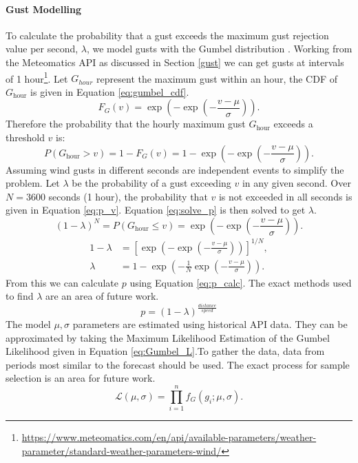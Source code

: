 \paragraph{Gust Modelling}
To calculate the probability that a gust exceeds the maximum gust rejection value per second, $\lambda$, we model gusts with the Gumbel distribution \cite{Gumbel1958}. Working from the Meteomatics \gls{API} as discussed in Section \ref{gust} we can get gusts at intervals of 1 hour\footnote{\url{https://www.meteomatics.com/en/api/available-parameters/weather-parameter/standard-weather-parameters-wind/}}. Let $G_{hour}$ represent the maximum gust within an hour, the \gls{CDF} of \( G_{\text{hour}} \) is given in Equation \ref{eq:gumbel_cdf}.
\begin{equation}\label{eq:gumbel_cdf}
    F_G(v) = \exp\left(-\exp\left(-\frac{v - \mu}{\sigma}\right)\right).
\end{equation}
Therefore the probability that the hourly maximum gust \( G_{\text{hour}} \) exceeds a threshold \( v \) is:
\begin{equation}
    P(G_{\text{hour}} > v) = 1 - F_G(v) = 1 - \exp\left(-\exp\left(-\frac{v - \mu}{\sigma}\right)\right).
\end{equation}
Assuming wind gusts in different seconds are independent events to simplify the problem. Let \( \lambda \) be the probability of a gust exceeding \( v \) in any given second. Over \( N = 3600 \) seconds (1 hour), the probability that \( v \) is not exceeded in all seconds is given in Equation \ref{eq:p_v}. Equation \ref{eq:solve_p} is then solved to get $\lambda$.
\begin{equation}\label{eq:p_v}
    (1 - \lambda)^{N} = P(G_{\text{hour}} \leq v) = \exp\left(-\exp\left(-\frac{v - \mu}{\sigma}\right)\right).
\end{equation}
\begin{align}\label{eq:solve_p}
    1 - \lambda &= \left[\exp\left(-\exp\left(-\frac{v - \mu}{\sigma}\right)\right)\right]^{1/N}, \\
    \lambda &= 1 - \exp\left(-\frac{1}{N} \exp\left(-\frac{v - \mu}{\sigma}\right)\right).
\end{align}
 From this we can calculate $p$ using Equation \ref{eq:p_calc}. The exact methods used to find $\lambda$ are an area of future work.
\begin{equation}\label{eq:p_calc}
    p = (1-\lambda)^{\frac{distance}{speed}}
\end{equation}
The model $\mu, \sigma$ parameters are estimated using historical API data. They can be approximated by taking the Maximum Likelihood Estimation of the Gumbel Likelihood given in Equation \ref{eq:Gumbel_L}\cite{Gumbel1958}.To gather the data, data from periods most similar to the forecast should be used. The exact process for sample selection is an area for future work.
\begin{equation}\label{eq:Gumbel_L}
    \mathcal{L}(\mu, \sigma) = \prod_{i=1}^n f_G(g_i; \mu, \sigma).
\end{equation}

